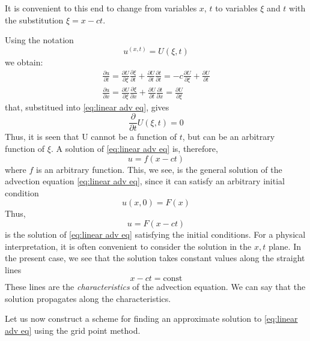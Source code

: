 It is convenient to this end to change from variables $x$, $t$ to variables $\xi$ and $t$ with the substitution $\xi=x-ct$.

Using the notation
$$u^{(x,t)}=U(\xi,t)$$
we obtain:
\begin{align}
	\frac{\partial u}{\partial t}=\frac{\partial U}{\partial\xi}\frac{\partial\xi}{\partial t}+\frac{\partial U}{\partial t}\frac{\partial t}{\partial t}=-c\frac{\partial U}{\partial\xi}+\frac{\partial U}{\partial t} \\
	\frac{\partial u}{\partial x}=\frac{\partial U}{\partial\xi}\frac{\partial\xi}{\partial x}+\frac{\partial U}{\partial t}\frac{\partial t}{\partial x}=\frac{\partial U}{\partial\xi}
\end{align}
that, substitued into \ref{eq:linear adv eq}, gives
$$\frac{\partial}{\partial t}U(\xi, t)=0$$
Thus, it is seen that U cannot be a function of $t$, but can be an arbitrary function of $\xi$. A solution of \ref{eq:linear adv eq} is, therefore,
\begin{equation}\label{eq:sol of linear adv eq}
	u=f(x-ct)
\end{equation}
where $f$ is an arbitrary function. This, we see, is the general solution of the advection equation \ref{eq:linear adv eq}, since it can satisfy an arbitrary initial condition
\begin{equation}
	u(x,0)=F(x)
\end{equation}
Thus,
\begin{equation}
	u=F(x-ct)
\end{equation}
is the solution of \ref{eq:linear adv eq} satisfying the initial conditions.
For a physical interpretation, it is often convenient to consider the solution in the $x, t$ plane. In the present case, we see that the solution takes constant values along the straight lines
$$x-ct= \text{const}$$
These lines are the \textit{characteristics} of the advection equa­tion. We can say that the solution propagates along the characteristics.

Let us now construct a scheme for finding an approxi­mate solution to \ref{eq:linear adv eq} using the grid point method.

